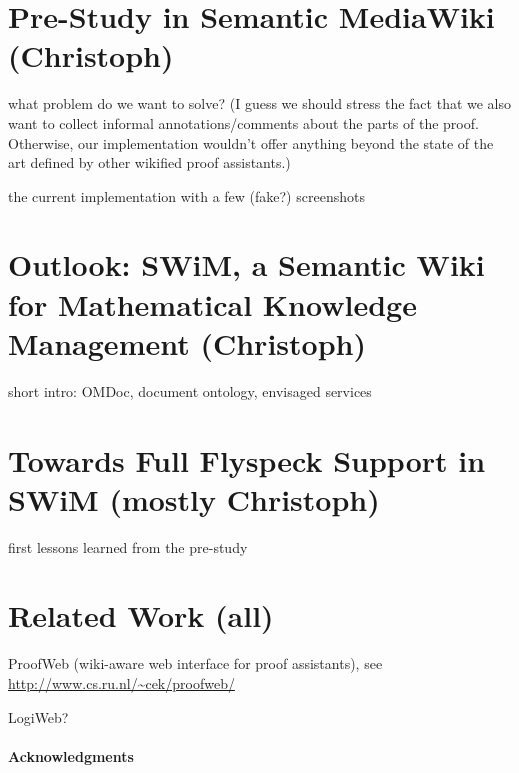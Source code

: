\documentclass{llncs}
\begin{document}
\section{Pre-Study in Semantic MediaWiki (Christoph)}
\label{sec:smw-study}

what problem do we want to solve?  (I guess we should stress the fact that we also want to
collect informal annotations/comments about the parts of the proof.  Otherwise, our
implementation wouldn't offer anything beyond the state of the art defined by other
wikified proof assistants.)

the current implementation with a few (fake?) screenshots

\section{Outlook: SWiM, a Semantic Wiki for Mathematical Knowledge Management (Christoph)}
\label{sec:swim}

short intro: OMDoc, document ontology, envisaged services

\section{Towards Full Flyspeck Support in SWiM (mostly Christoph)}
\label{sec:flyspeck-swim}

first lessons learned from the pre-study

\section{Related Work (all)}
\label{sec:related}

ProofWeb (wiki-aware web interface for proof assistants), see
\url{http://www.cs.ru.nl/~cek/proofweb/}

LogiWeb?

\paragraph{Acknowledgments}
\label{sec:ack}





\ednotemessage
\end{document}
